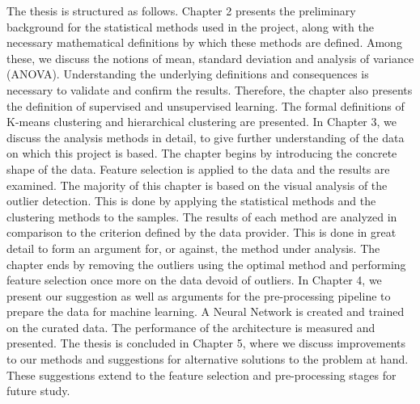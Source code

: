 The thesis is structured as follows. Chapter 2 presents the preliminary background for the statistical methods used in the project, along with the necessary mathematical definitions by which these methods are defined. Among these, we discuss the notions of mean, standard deviation and analysis of variance (ANOVA). Understanding the underlying definitions and consequences is necessary to validate and confirm the results. Therefore, the chapter also presents the definition of supervised and unsupervised learning. The formal definitions of K-means clustering and hierarchical clustering are presented. In Chapter 3, we discuss the analysis methods in detail, to give further understanding of the data on which this project is based. The chapter begins by introducing the concrete shape of the data. Feature selection is applied to the data and the results are examined. The majority of this chapter is based on the visual analysis of the outlier detection. This is done by applying the statistical methods and the clustering methods to the samples. The results of each method are analyzed in comparison to the criterion defined by the data provider. This is done in great detail to form an argument for, or against, the method under analysis. The chapter ends by removing the outliers using the optimal method and performing feature selection once more on the data devoid of outliers. In Chapter 4, we present our suggestion as well as arguments for the pre-processing pipeline to prepare the data for machine learning. A Neural Network is created and trained on the curated data. The performance of the architecture is measured and presented. The thesis is concluded in Chapter 5, where we discuss improvements to our methods and suggestions for alternative solutions to the problem at hand. These suggestions extend to the feature selection and pre-processing stages for future study.

